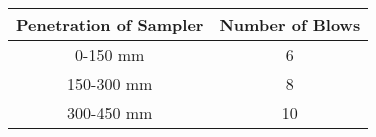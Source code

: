 \begin{tabular}[12pt]{|c|c|}
    \hline
    Penetration of Sampler & Number of Blows \\ 
    \hline
    0-150 mm & 6 \\
    \hline
    150-300 mm & 8 \\
    \hline
    300-450 mm & 10 \\ 
    \hline
    \end{tabular}
